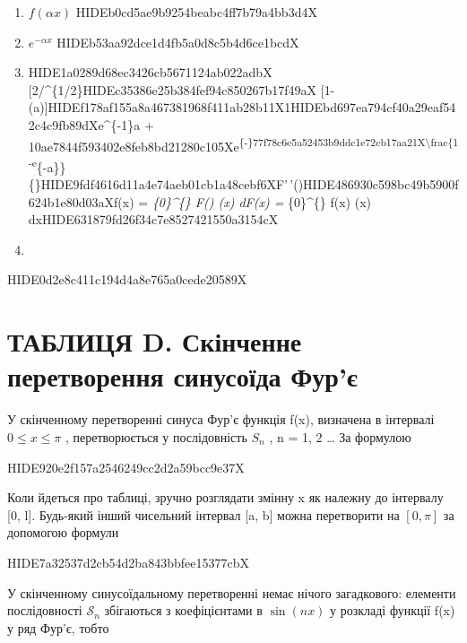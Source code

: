 \documentclass[
  ukrainian,
]{article}
\begin{document}
\begin{enumerate}
\def\labelenumi{\arabic{enumi}.}
\setcounter{enumi}{1}
\item
  \(f(\alpha x)\) HIDEb0cd5ae9b9254beabc4ff7b79a4bb3d4X
\item
  \(e^{-\alpha x}\) HIDEb53aa92dce1d4fb5a0d8c5b4d6ce1bcdX
\item
  HIDE1a0289d68ec3426cb5671124ab022adbX
  {[}2/\pi\omega{]}\^{}\{1/2\}HIDEc35386e25b384fef94c850267b17f49aX
  {[}1-\cos(\omega a){]}HIDEf178af155a8a467381968f411ab28b11X1HIDEbd697ea794cf40a29eaf542c4c9fb89dXe\^{}\{-1\}a
  +
  \omegaHIDE10ae7844f593402e8feb8bd21280c105Xe\textsuperscript{\{-\alpha\}\sin\omegaHIDE77f78c6e5a52453b9ddc1e72cb17aa21X\textbackslash frac\{1-e}\{-a\omega\}\}\{\omega\}HIDE9fdf4616d11a4e74aeb01cb1a48cebf6XF'\,'(\omega)HIDE486930c598bc49b5900f624b1e80d03aXf(x)
  = \int\emph{\{0\}\^{}\{\infty\} F(\omega) \cos(\omega x)
  d\omega \qquad \qquad F(x) =  \int}\{0\}\^{}\{\infty\}
  f(x) \cos(\omega x) dxHIDE631879fd26f34c7e8527421550a3154cX
\item
\end{enumerate}

HIDE0d2e8c411c194d4a8e765a0cede20589X

\section{ТАБЛИЦЯ D. Скінченне перетворення синусоїда
Фур'є}\label{ux442ux430ux431ux43bux438ux446ux44f-d.-ux441ux43aux456ux43dux447ux435ux43dux43dux435-ux43fux435ux440ux435ux442ux432ux43eux440ux435ux43dux43dux44f-ux441ux438ux43dux443ux441ux43eux457ux434ux430-ux444ux443ux440ux454}

У скінченному перетворенні синуса Фур'є функція f(x), визначена в
інтервалі \(0 \le x \le \pi\) , перетворюється у послідовність \(S_n\) ,
n = 1, 2 \ldots{} За формулою

HIDE920e2f157a2546249cc2d2a59bcc9e37X

Коли йдеться про таблиці, зручно розглядати змінну x як належну до
інтервалу {[}0, l{]}. Будь-який інший чисельний інтервал {[}a, b{]}
можна перетворити на \([0, \pi]\) за допомогою формули

HIDE7a32537d2cb54d2ba843bbfee15377cbX

У скінченному синусоїдальному перетворенні немає нічого загадкового:
елементи послідовності \(\mathcal{S}_n\) збігаються з коефіцієнтами в
\(\sin(nx)\) у розкладі функції f(x) у ряд Фур'є, тобто
\end{document}
